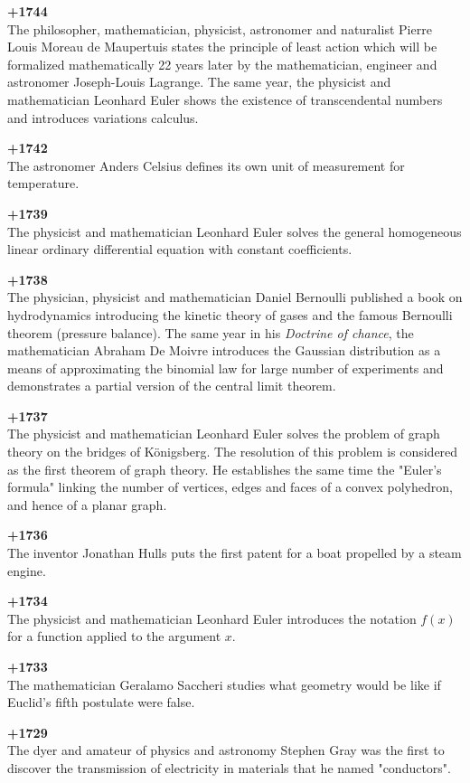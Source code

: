 \textbf{+1744}\\
The philosopher, mathematician, physicist, astronomer and naturalist Pierre Louis Moreau de Maupertuis states the principle of least action which will be formalized mathematically 22 years later by the mathematician, engineer and astronomer Joseph-Louis Lagrange. The same year, the physicist and mathematician Leonhard Euler shows the existence of transcendental numbers and introduces variations calculus.

\textbf{+1742}\\
The astronomer Anders Celsius defines its own unit of measurement for temperature.

\textbf{+1739}\\
The physicist and mathematician Leonhard Euler solves the general homogeneous linear ordinary differential equation with constant coefficients.

\textbf{+1738}\\
The physician, physicist and mathematician Daniel Bernoulli published a book on hydrodynamics introducing the kinetic theory of gases and the famous Bernoulli theorem (pressure balance). The same year in his \textit{Doctrine of chance}, the mathematician Abraham De Moivre introduces the Gaussian distribution as a means of approximating the binomial law for large number of experiments and demonstrates a partial version of the central limit theorem.

\textbf{+1737}\\
The physicist and mathematician Leonhard Euler solves the problem of graph theory on the bridges of Königsberg. The resolution of this problem is considered as the first theorem of graph theory. He establishes the same time the "Euler's formula" linking the number of vertices, edges and faces of a convex polyhedron, and hence of a planar graph.

\textbf{+1736}\\
The inventor Jonathan Hulls puts the first patent for a boat propelled by a steam engine.

\textbf{+1734}\\
The physicist and mathematician Leonhard Euler introduces the notation $f(x)$ for a function applied to the argument $x$.

\textbf{+1733}\\
The mathematician Geralamo Saccheri studies what geometry would be like if Euclid's fifth postulate were false.

\textbf{+1729}\\
The dyer and amateur of physics and astronomy Stephen Gray was the first to discover the transmission of electricity in materials that he named "conductors".

